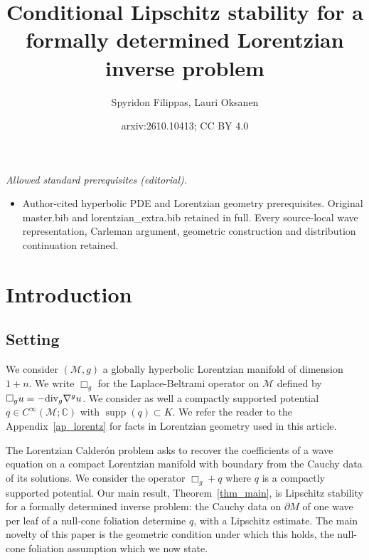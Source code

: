 \documentclass[12pt,reqno]{amsart}
\title{Conditional Lipschitz stability for a formally determined Lorentzian inverse problem}
\author{Spyridon Filippas, Lauri Oksanen}
\date{arxiv:2610.10413; CC BY 4.0}
\numberwithin{equation}{section}
\theoremstyle{definition}
\theoremstyle{plain}
\theoremstyle{definition}
\theoremstyle{definition}
\def\C{\mathbb C}
\newcommand{\M}{\mathcal{M}}
\newcommand{\uu}{M}
\DeclareMathOperator{\supp}{supp}
\begin{document}
\maketitle
\noindent\textit{Allowed standard prerequisites (editorial).}\begin{itemize}
\item Author-cited hyperbolic PDE and Lorentzian geometry prerequisites. Original master.bib and lorentzian\_extra.bib retained in full. Every source-local wave representation, Carleman argument, geometric construction and distribution continuation retained.
\end{itemize}\medskip
\section{Introduction}

\subsection{Setting}\label{sec:intro_setting}

We consider $(\M,g)$ a globally hyperbolic Lorentzian manifold of dimension $1+n$. We write $\Box_{g}$ for the Laplace-Beltrami operator on $\M$ defined by $\Box_{g}u= - \textnormal{div}_{g} \nabla^{g}u$. We consider as well a compactly supported potential $q \in C^\infty (\M ; \C ) $ with $\supp(q) \subset K$. We refer the reader to the Appendix~\ref{ap_lorentz} for facts in Lorentzian geometry used in this article.

The Lorentzian Calder\'on problem asks to recover the coefficients of a wave equation on a compact Lorentzian manifold with boundary from the Cauchy data of its solutions. We consider the operator $\Box_g+q$ where $q$ is a compactly supported potential. Our main result, Theorem~\ref{thm_main}, is Lipschitz stability for a formally determined inverse problem: the Cauchy data on $\partial\uu$ of one wave per leaf of a null-cone foliation determine $q$, with a Lipschitz estimate. The main novelty of this paper is the geometric condition under which this holds, the null-cone foliation assumption which we now state. 
\end{document}
